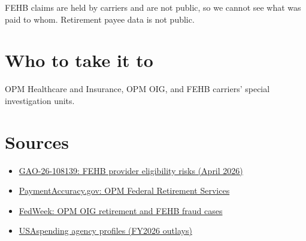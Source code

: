 \documentclass[letterpaper,11pt]{article}
\providecommand{\tightlist}{\setlength{\itemsep}{0pt}\setlength{\parskip}{0pt}}
\begin{document}
FEHB claims are held by carriers and are not public, so we cannot see
what was paid to whom. Retirement payee data is not public.

\hypertarget{who-to-take-it-to}{%
\section{Who to take it to}\label{who-to-take-it-to}}

OPM Healthcare and Insurance, OPM OIG, and FEHB carriers' special
investigation units.

\hypertarget{sources}{%
\section{Sources}\label{sources}}

\begin{itemize}
\tightlist
\item
  \href{https://files.gao.gov/reports/GAO-26-108139/index.html}{GAO-26-108139:
  FEHB provider eligibility risks (April 2026)}
\item
  \href{https://paymentaccuracy.gov/program/opm-federal-retirement-services}{PaymentAccuracy.gov:
  OPM Federal Retirement Services}
\item
  \href{https://www.fedweek.com/issue-briefs/bogus-claims-cashing-checks-of-deceased-ig-cites-cases-of-fehbp-retirement-fraud/}{FedWeek:
  OPM OIG retirement and FEHB fraud cases}
\item
  \href{https://www.usaspending.gov/agency}{USAspending agency profiles
  (FY2026 outlays)}
\end{itemize}
\end{document}
